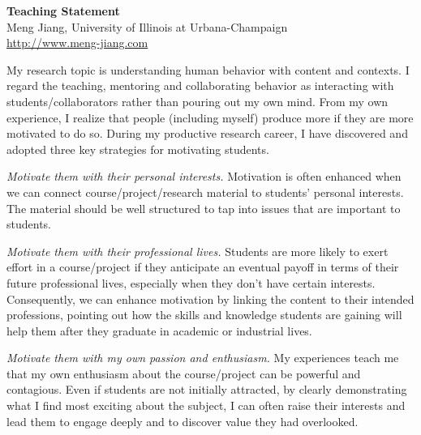 \documentclass[10.5pt]{article}
\begin{document}
\begin{center}
{\LARGE \bf Teaching Statement} \\
\vskip 0.05in
{\large Meng Jiang, University of Illinois at Urbana-Champaign} \\
{\url{http://www.meng-jiang.com}}
\vskip -0.1in
\end{center}

My research topic is understanding human behavior with content and contexts. I regard the teaching, mentoring and collaborating behavior as interacting with students/collaborators rather than pouring out my own mind. From my own experience, I realize that people (including myself) produce more if they are more motivated to do so.
During my productive research career, I have discovered and adopted three key strategies for motivating students.
\begin{compactitem}
\item \textit{Motivate them with their personal interests.} Motivation is often enhanced when we can connect course/project/research material to students' personal interests. The material should be well structured to tap into issues that are important to students. %
\item \textit{Motivate them with their professional lives.} Students are more likely to exert effort in a course/project if they anticipate an eventual payoff in terms of their future professional lives, especially when they don't have certain interests. Consequently, we can enhance motivation by linking the content to their intended professions, pointing out how the skills and knowledge students are gaining will help them after they graduate in academic or industrial lives.
\item \textit{Motivate them with my own passion and enthusiasm.} My experiences teach me that my own enthusiasm about the course/project can be powerful and contagious. Even if students are not initially attracted, by clearly demonstrating what I find most exciting about the subject, I can often raise their interests and lead them to engage deeply and to discover value they had overlooked.
\end{compactitem}
\end{document}
